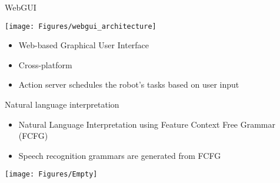 \documentclass[12pt,a4paper]{article}
\newcommand{\emptylogo}{\texttt{[image: Figures/Empty]}}
\begin{document}
\begin{slidetop}
\begin{multicols}{2}
\begin{bclogo}[couleur = white, arrondi = 0.25, couleurBord = tuedarkblue , barre = none, logo=\emptylogo]{\textcolor{tuedarkblue}{WebGUI}}
\medskip %
\begin{minipage}[T]{\textwidth}
    \begin{center}
        \texttt{[image: Figures/webgui\_architecture]}
    \end{center}
\end{minipage}
\begin{itemize}[itemsep = 0pt, parsep = 0pt, leftmargin=15pt]
	\item Web-based Graphical User Interface
	\item Cross-platform
	\item Action server schedules the robot's tasks based on user input
\end{itemize}
\end{bclogo}

\vspace{-0.83cm} %

\begin{bclogo}[couleur = white, arrondi = 0.25, couleurBord = tuedarkblue, barre = none, logo=\emptylogo]{\textcolor{tuedarkblue}{Natural language interpretation}}
\medskip %
\begin{itemize}[itemsep = 0pt, parsep = 0pt, leftmargin=15pt]
	\item Natural Language Interpretation using Feature Context Free Grammar (FCFG)
	\item Speech recognition grammars are generated from FCFG
\end{itemize}
\end{bclogo}

\texttt{[image: Figures/Empty]}
\end{multicols}
\end{slidetop}
\end{document}
